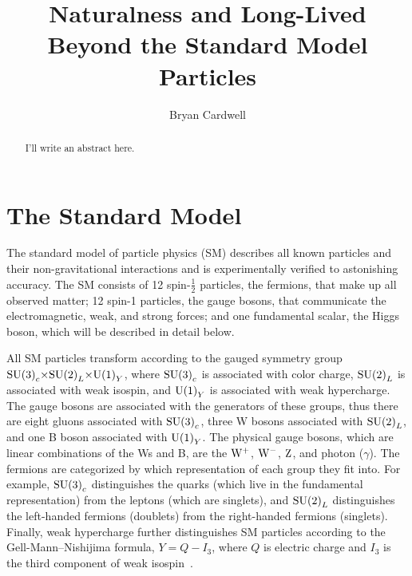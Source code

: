 \documentclass[12pt]{article}
\title{Naturalness and Long-Lived Beyond the Standard Model Particles}
\author{Bryan Cardwell}
\begin{document}
\singlespacing
\maketitle

\begin{abstract}

I'll write an abstract here.

\end{abstract}

\newpage
\tableofcontents
\newpage
\doublespacing
\linenumbers
{}


\section{The Standard Model} \label{SM}
    The standard model of particle physics (SM) describes all known particles and their non-gravitational interactions and is experimentally verified to astonishing  accuracy. The SM consists of \num{12} spin-$\frac{1}{2}$ particles, the fermions, that make up all observed matter; \num{12} spin-1 particles, the gauge bosons, that communicate the electromagnetic, weak, and strong forces; and one fundamental scalar, the Higgs boson, which will be described in detail below.
    
    All SM particles transform according to the gauged symmetry group $\mathrm{SU} {\left(3\right)}_c {\times} \mathrm{SU} {\left(2\right)}_L {\times} \mathrm{U} {\left(1\right)}_Y$, where $\mathrm{SU} {\left(3\right)}_c$ is associated with color charge, $\mathrm{SU} {\left(2\right)}_L$ is associated with weak isospin, and $\mathrm{U} {\left(1\right)}_Y$ is associated with weak hypercharge. The gauge bosons are associated with the generators of these groups, thus there are eight gluons associated with $\mathrm{SU} {\left(3\right)}_c$, three W bosons associated with $\mathrm{SU} {\left(2\right)}_L$, and one B boson associated with $\mathrm{U} {\left(1\right)}_Y$. The physical gauge bosons, which are linear combinations of the Ws and B, are the $\mathrm{W}^+$, $\mathrm{W}^-$, $\mathrm{Z}$, and photon ($\gamma$). The fermions are categorized by which representation of each group they fit into. For example, $\mathrm{SU} {\left(3\right)}_c$ distinguishes the quarks (which live in the fundamental representation) from the leptons (which are singlets), and $\mathrm{SU} {\left(2\right)}_L$ distinguishes the left-handed fermions (doublets) from the right-handed fermions (singlets). Finally, weak hypercharge further distinguishes SM particles according to the Gell-Mann--Nishijima formula, $Y=Q-I_3$, where $Q$ is electric charge and $I_3$ is the third component of weak isospin~\cite{sm_intro}.
\end{document}
